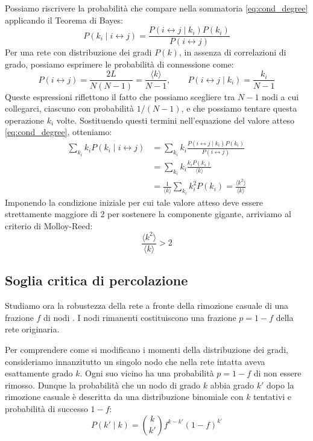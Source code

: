 \documentclass[12pt,italian]{article}
\begin{document}
Possiamo riscrivere la probabilità che compare nella sommatoria \eqref{eq:cond_degree} applicando il Teorema di Bayes:
\begin{equation}
    P(k_i \mid i \leftrightarrow j) = \frac{P(i \leftrightarrow j \mid k_i) P(k_i)}{P(i \leftrightarrow j)}
\end{equation}
Per una rete con distribuzione dei gradi $P(k)$, in assenza di correlazioni di grado, possiamo esprimere le probabilità di connessione come:
\begin{equation}
    P(i \leftrightarrow j) = \frac{2L}{N(N-1)} = \frac{\langle k \rangle}{N-1}, \quad\quad P(i \leftrightarrow j \mid k_i) = \frac{k_i}{N-1}
\end{equation}
Queste espressioni riflettono il fatto che possiamo scegliere tra $N-1$ nodi a cui collegarci, ciascuno con probabilità $1/(N-1)$, e che possiamo tentare questa operazione $k_i$ volte. Sostituendo questi termini nell'equazione del valore atteso \eqref{eq:cond_degree}, otteniamo:
\begin{align}
    \sum_{k_i} k_i P(k_i \mid i \leftrightarrow j) &= \sum_{k_i} k_i \frac{P(i \leftrightarrow j \mid k_i) P(k_i)}{P(i \leftrightarrow j)} \nonumber \\
    &= \sum_{k_i} k_i \frac{k_i P(k_i)}{\langle k \rangle} \nonumber \\
    &= \frac{1}{\langle k \rangle} \sum_{k_i} k_i^2 P(k_i) = \frac{\langle k^2 \rangle}{\langle k \rangle}
\end{align}
Imponendo la condizione iniziale per cui tale valore atteso deve essere strettamente maggiore di 2 per sostenere la componente gigante, arriviamo al criterio di Molloy-Reed:
\begin{equation}
    \frac{\langle k^2 \rangle}{\langle k \rangle} > 2
\end{equation}
\subsection{Soglia critica di percolazione}\label{sec:perc_tresh}
Studiamo ora la robustezza della rete a fronte della rimozione casuale di una frazione $f$ di nodi \cite{barabasi2016network}. I nodi rimanenti costituiscono una frazione $p = 1 - f$ della rete originaria. 

Per comprendere come si modificano i momenti della distribuzione dei gradi, consideriamo innanzitutto un singolo nodo che nella rete intatta aveva esattamente grado $k$. 
Ogni suo vicino ha una probabilità $p = 1-f$ di non essere rimosso. Dunque la probabilità che un nodo di grado $k$ abbia grado $k'$ dopo la rimozione casuale è descritta da una distribuzione binomiale con $k$ tentativi e probabilità di successo $1-f$:
\begin{equation}
    P(k' \mid k) = \binom{k}{k'} f^{k - k'} (1-f)^{k'}
\end{equation}
\end{document}

